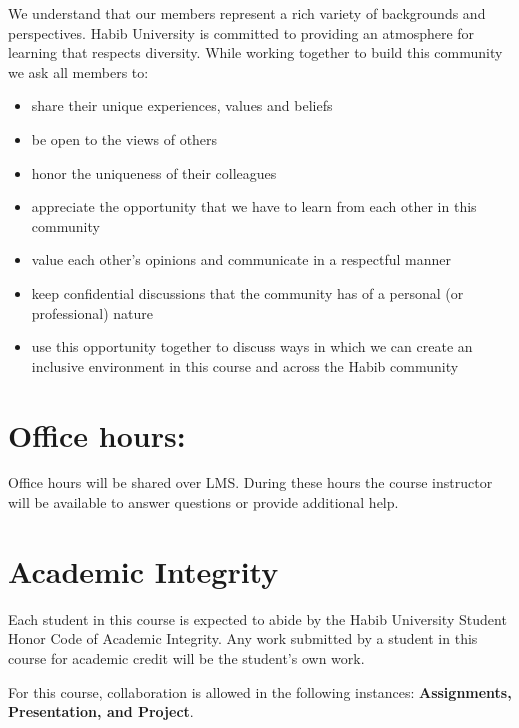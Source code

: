 \documentclass[a4paper]{article}
\begin{document}
We understand that our members represent a rich variety of backgrounds and perspectives. Habib University is committed to providing an atmosphere for learning that respects diversity. While working together to build this community we ask all members to:
\begin{itemize}
\item share their unique experiences, values and beliefs
\item be open to the views of others 
\item honor the uniqueness of their colleagues
\item appreciate the opportunity that we have to learn from each other in this community
\item value each other's opinions and communicate in a respectful manner
\item keep confidential discussions that the community has of a personal (or professional) nature 
\item use this opportunity together to discuss ways in which we can create an inclusive environment in this course and across the Habib community 
\end{itemize}

\section{Office hours:}

Office hours will be shared over LMS. During these hours the course instructor will be available to answer questions or provide additional help.

\section{Academic Integrity}

Each student in this course is expected to abide by the Habib University Student Honor Code of Academic Integrity.  Any work submitted by a student in this course for academic credit will be the student's own work.

For this course, collaboration is allowed in the following instances: \textbf{Assignments, Presentation, and Project}.
\end{document}
